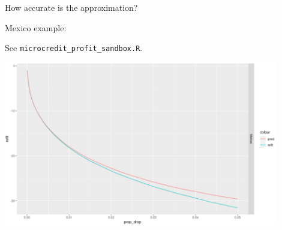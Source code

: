 \begin{frame}{How accurate is the approximation?}

Mexico example:

See \texttt{microcredit\_profit\_sandbox.R}.

\includegraphics[width=0.9\textwidth]{static_figures/mx_refit_example}

\end{frame}



